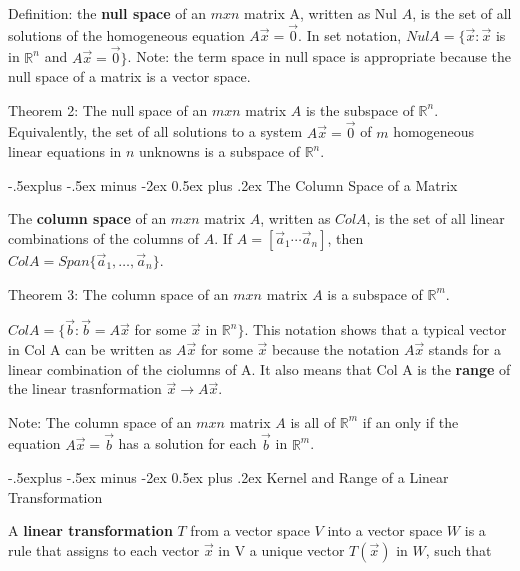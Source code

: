 \documentclass[10pt,landscape]{article}
\makeatletter
\renewcommand{\subsection}{\@startsection{subsection}{2}{0mm}%
                                {-.5explus -.5ex minus -2ex}%
                                {0.5ex plus .2ex}%
                                {\normalfont\footnotesize\bfseries}}
\makeatother
\begin{document}
\begin{multicols}{4}
{{\medskip

Definition: the \textbf{null space} of an $m x n$ matrix A, written as Nul $ A$, is the set of all solutions of the homogeneous equation $A\vec{x}=\vec{0}$. In set notation, $Nul A = \{\vec{x}:\vec{x}$ is in $\mathbb{R}^n$ and $A\vec{x}=\vec{0}\}$. Note: the term space in null space is appropriate because the null space of a matrix is a vector space.

\medskip

Theorem 2: The null space of an $m x n$ matrix $A$ is the subspace of $\mathbb{R}^n$. Equivalently, the set of all solutions to a system $A\vec{x}=\vec{0}$ of $m$ homogeneous linear equations in $n$ unknowns is a subspace of $\mathbb{R}^n$. 

\subsection{The Column Space of a Matrix}

The \textbf{column space} of an $m x n$ matrix $A$, written as $Col A$, is the set of all linear combinations of the columns of $A$. If $A = [\vec{a}_1 \cdots \vec{a}_n]$, then $Col A = Span\{\vec{a}_1, \dots, \vec{a}_n\}$.  

Theorem 3: The column space of an $m x n$ matrix $A$ is a subspace of $\mathbb{R}^m$. 

\medskip

$Col A= \{\vec{b}:\vec{b}= A\vec{x}$ for some $\vec{x}$ in $\mathbb{R}^n\}$. This notation shows that a typical vector in Col A can be written as $A\vec{x}$ for some $\vec{x}$ because the notation $A\vec{x}$ stands for a linear combination of the ciolumns of A. It also means that Col A is the \textbf{range} of the linear trasnformation $\vec{x} \to A\vec{x}$. 

\medskip

Note: The column space of an $m x n$ matrix $A$ is all of $\mathbb{R}^m$ if an only if the equation $A\vec{x}=\vec{b}$ has a solution for each $\vec{b}$ in $\mathbb{R}^m$.

\subsection{Kernel and Range of a Linear Transformation}

A \textbf{linear transformation} $T$ from a vector space $V$ into a vector space $W$ is a rule that assigns to each vector $\vec{x}$ in V a unique vector $T(\vec{x})$ in $W$, such that 

}}
\end{multicols}
\end{document}
